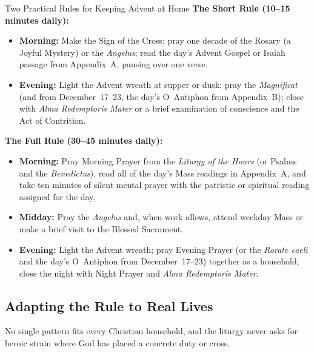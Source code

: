 \begin{massbox}{Two Practical Rules for Keeping Advent at Home}
\textbf{The Short Rule (10--15 minutes daily):}
\begin{itemize}
  \item \textbf{Morning:} Make the Sign of the Cross; pray one decade of the Rosary (a Joyful Mystery) or the \textit{Angelus}; read the day's Advent Gospel or Isaiah passage from Appendix~A, pausing over one verse.
  \item \textbf{Evening:} Light the Advent wreath at supper or dusk; pray the \textit{Magnificat} (and from December~17--23, the day's O~Antiphon from Appendix~B); close with \textit{Alma Redemptoris Mater} or a brief examination of conscience and the Act of Contrition.
\end{itemize}
\textbf{The Full Rule (30--45 minutes daily):}
\begin{itemize}
  \item \textbf{Morning:} Pray Morning Prayer from the \textit{Liturgy of the Hours} (or Psalms and the \textit{Benedictus}), read all of the day's Mass readings in Appendix~A, and take ten minutes of silent mental prayer with the patristic or spiritual reading assigned for the day.
  \item \textbf{Midday:} Pray the \textit{Angelus} and, when work allows, attend weekday Mass or make a brief visit to the Blessed Sacrament.
  \item \textbf{Evening:} Light the Advent wreath; pray Evening Prayer (or the \textit{Rorate caeli} and the day's O~Antiphon from December~17--23) together as a household; close the night with Night Prayer and \textit{Alma Redemptoris Mater}.
\end{itemize}
\end{massbox}

\subsection{Adapting the Rule to Real Lives}

No single pattern fits every Christian household, and the liturgy never asks for heroic strain where God has placed a concrete duty or cross.

